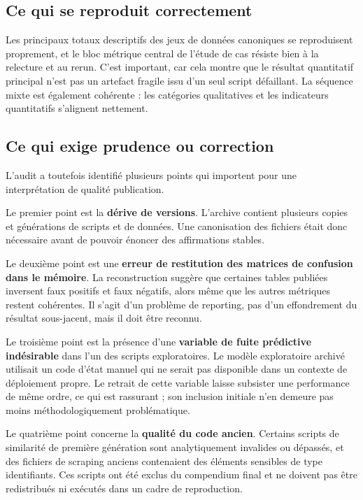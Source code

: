 \documentclass[10pt,a4paper]{article}
\begin{document}
\subsection{Ce qui se reproduit correctement}
Les principaux totaux descriptifs des jeux de données canoniques se reproduisent proprement, et le bloc métrique central de l'étude de cas résiste bien à la relecture et au rerun. C'est important, car cela montre que le résultat quantitatif principal n'est pas un artefact fragile issu d'un seul script défaillant. La séquence mixte est également cohérente : les catégories qualitatives et les indicateurs quantitatifs s'alignent nettement.

\subsection{Ce qui exige prudence ou correction}
L'audit a toutefois identifié plusieurs points qui importent pour une interprétation de qualité publication.

Le premier point est la \textbf{dérive de versions}. L'archive contient plusieurs copies et générations de scripts et de données. Une canonisation des fichiers était donc nécessaire avant de pouvoir énoncer des affirmations stables.

Le deuxième point est une \textbf{erreur de restitution des matrices de confusion dans le mémoire}. La reconstruction suggère que certaines tables publiées inversent faux positifs et faux négatifs, alors même que les autres métriques restent cohérentes. Il s'agit d'un problème de reporting, pas d'un effondrement du résultat sous-jacent, mais il doit être reconnu.

Le troisième point est la présence d'une \textbf{variable de fuite prédictive indésirable} dans l'un des scripts exploratoires. Le modèle exploratoire archivé utilisait un code d'état manuel qui ne serait pas disponible dans un contexte de déploiement propre. Le retrait de cette variable laisse subsister une performance de même ordre, ce qui est rassurant ; son inclusion initiale n'en demeure pas moins méthodologiquement problématique.

Le quatrième point concerne la \textbf{qualité du code ancien}. Certains scripts de similarité de première génération sont analytiquement invalides ou dépassés, et des fichiers de scraping anciens contenaient des éléments sensibles de type identifiants. Ces scripts ont été exclus du compendium final et ne doivent pas être redistribués ni exécutés dans un cadre de reproduction.
\end{document}
